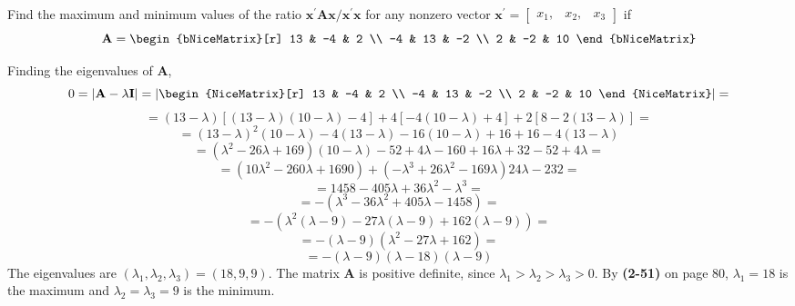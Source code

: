         Find the maximum and minimum values of the ratio $\mathbf{x}^\prime\mathbf{A}\mathbf{x}/\mathbf{x}^\prime\mathbf{x}$ for any nonzero vector $\mathbf{x}^\prime = \begin{bmatrix}
            x_1, & x_2, & x_3
        \end{bmatrix}$ if
        \[
            \textbf{A}
            =
            \begin{bNiceMatrix}[r]
                13 & -4 & 2 \\
                -4 & 13 & -2 \\
                2 & -2 & 10
            \end{bNiceMatrix}
        \]
        \par
        Finding the eigenvalues of $\textbf{A}$,
        \[
            0 = \left|\textbf{A} - \lambda\textbf{I}\right|
            =
            \left|
            \begin{NiceMatrix}[r]
                13 & -4 & 2 \\
                -4 & 13 & -2 \\
                2 & -2 & 10
            \end{NiceMatrix}
            \right|
            =
        \]
        \[
            =
            {\left(13-\lambda\right)}
            \left[\left(13-\lambda\right)\left(10-\lambda\right) - 4\right]
            + 4\left[-4\left(10-\lambda\right)+ 4\right]
            + 2\left[8 - 2\left(13-\lambda\right)\right]
            =
        \]
        \[
            =
            {\left(13-\lambda\right)}^2{\left(10-\lambda\right)}
            -4{\left(13-\lambda\right)}
            -16{\left(10-\lambda\right)}
            +16+16
            -4{\left(13-\lambda\right)}
        \]
        \[
            =
            \left(\lambda^2 - 26\lambda + 169\right)\left(10-\lambda\right)
            -52 + 4\lambda - 160 + 16\lambda + 32 - 52 + 4\lambda
            =
        \]
        \[
            =
            \left(10\lambda^2 - 260\lambda + 1690\right)
            +\left(-\lambda^3 + 26\lambda^2 - 169\lambda\right)
            24\lambda - 232
            =
        \]
        \[
            =
            1458 - 405\lambda + 36\lambda^2 - \lambda^3
            =
        \]
        \[
            =
            -\left(\lambda^3 - 36\lambda^2 + 405\lambda - 1458\right)
            =
        \]
        \[
            =
            -\left(\lambda^2\left(\lambda-9\right) - 27\lambda\left(\lambda-9\right) + 162\left(\lambda-9\right)\right)
            =
        \]
        \[
            =
            -\left(\lambda-9\right)\left(\lambda^2 - 27\lambda + 162\right)
            =
        \]
        \[
            =
            -\left(\lambda-9\right)\left(\lambda - 18\right)\left(\lambda - 9\right)
        \]
        The eigenvalues are $(\lambda_1, \lambda_2, \lambda_3) = (18, 9, 9)$. The matrix $\textbf{A}$ is positive definite, since $\lambda_1 > \lambda_2 > \lambda_3 > 0$.
        By \textbf{(2-51)} on page 80, $\lambda_1 = 18$ is the maximum and $\lambda_2 = \lambda_3 = 9$ is the minimum.